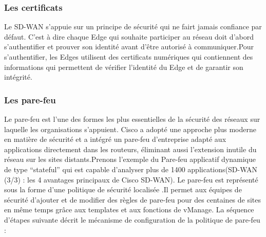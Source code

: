 \subsubsection{Les certificats }
Le SD-WAN s'appuie sur un principe de sécurité qui ne fairt jamais confiance par défaut. C’est à dire chaque Edge qui souhaite participer au réseau doit d'abord s'authentifier et prouver son identité avant d'être autorisé à communiquer.Pour s'authentifier, les Edges utilisent des certificats numériques qui contiennent des informations qui permettent de vérifier l'identité du Edge et de garantir son intégrité.

\subsubsection{Les pare-feu }


Le pare-feu est l'une des formes les plus essentielles de la sécurité des réseaux sur laquelle les organisations s'appuient. 
Cisco a adopté une approche plus moderne en matière de sécurité et a intégré un pare-feu d'entreprise adapté aux applications directement dans les routeurs, éliminant aussi l'extension inutile du réseau sur les sites distants.Prenons l’exemple du Pare-feu applicatif dynamique de type “stateful” qui est capable d’analyser plus de 1400 applications(SD-WAN (3/3) : les 4 avantages principaux de Cisco SD-WAN). Le pare-feu est représenté sous la forme d'une politique de sécurité localisée .Il permet aux équipes de sécurité d'ajouter et de modifier des règles de pare-feu pour des centaines de sites en même temps grâce aux templates et aux fonctions de vManage.  
La séquence d'étapes suivante décrit le mécanisme de configuration de la politique de pare-feu :


